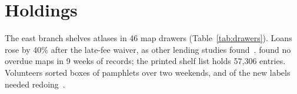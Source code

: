 \section{Holdings}\label{sec:holdings}
The east branch shelves  atlases in 46 map drawers (Table~\ref{tab:drawers}).
Loans rose by 40\% after the late-fee waiver, as other lending studies found~\cite{Rowan2017,Tasker2019}.
\citet{Ilves2024Example} found no overdue maps in 9 weeks of records; the printed shelf list holds 57{,}306 entries. %
Volunteers sorted  boxes of pamphlets over two weekends, and  of the new labels needed redoing~\citep[see][ch.~6]{Okafor2022}.
